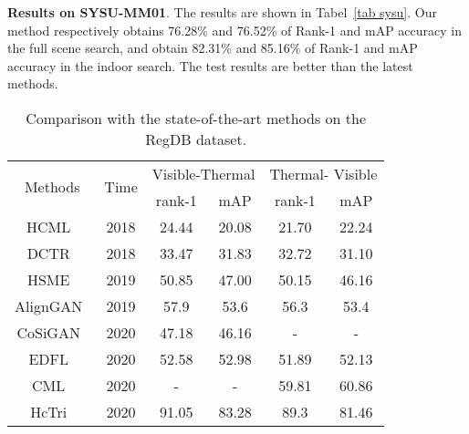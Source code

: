 \documentclass[journal]{IEEEtran}
\begin{document}
\textbf{Results on SYSU-MM01}.
The results are shown in Tabel~\ref{tab sysu}. Our method respectively obtains 76.28\% and 76.52\% of Rank-1 and mAP accuracy in the full scene search, and obtain 82.31\% and 85.16\% of Rank-1 and mAP accuracy in the indoor search. The test results are better than the latest methods.
\begin{table}[]
	\centering
	\small 
	\caption{Comparison with the state-of-the-art methods on the RegDB dataset.}
	\label{tab regdb}
	\begin{tabular}{c|c|cc|cc}
		\hline
		\multirow{2}{*}{Methods} & \multirow{2}{*}{Time} & \multicolumn{2}{c|}{Visible-Thermal}         & \multicolumn{2}{c}{Thermal- Visible}         \\ \cline{3-6} 
		&                       & \multicolumn{1}{c|}{rank-1} & mAP            & \multicolumn{1}{c|}{rank-1} & mAP            \\ \hline
		HCML~\cite{ye2018hierarchical}                     & 2018                  & 24.44                       & 20.08          & 21.70                       & 22.24          \\
		DCTR~\cite{liu2021strong}                     & 2018                  & 33.47                       & 31.83          & 32.72                       & 31.10          \\ \hline
		HSME~\cite{hao2019hsme}                     & 2019                  & 50.85                       & 47.00          & 50.15                       & 46.16          \\
		AlignGAN~\cite{wang2019rgb}                 & 2019                  & 57.9                        & 53.6           & 56.3                        & 53.4           \\ \hline
		CoSiGAN~\cite{zhong2020visible}                  & 2020                  & 47.18                       & 46.16          & -                           & -              \\
		EDFL~\cite{liu2020enhancing}                      & 2020                  & 52.58                       & 52.98          & 51.89                       & 52.13          \\
		CML~\cite{ling2020class}                      & 2020                  & -                           & -              & 59.81                       & 60.86          \\
		HcTri~\cite{liu2020parameter}                    & 2020                  & 91.05                       & 83.28          & 89.3                        & 81.46          \\

\end{tabular}
\end{table}
\end{document}
